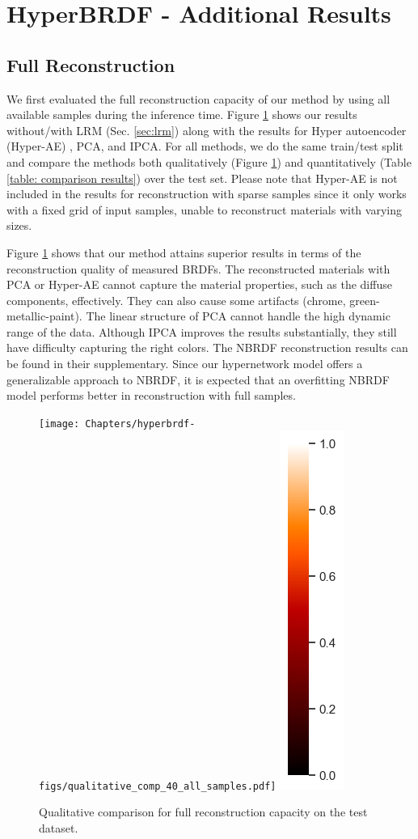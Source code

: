 \section{HyperBRDF - Additional Results}
\label{hyperbrdf:add_res}

\subsection{Full Reconstruction}\label{sec:full_rec}

We first evaluated the full reconstruction capacity of our method by using all available samples during the inference time. Figure \ref{fig:qual_comp} shows our results without/with LRM (Sec. \ref{sec:lrm}) along with the results for Hyper autoencoder (Hyper-AE) \cite{sztrajman2021neural}, PCA, and IPCA. For all methods, we do the same train/test split and compare the methods both qualitatively (Figure \ref{fig:qual_comp}) and quantitatively (Table \ref{table: comparison results}) over the test set. Please note that Hyper-AE is not included in the results for reconstruction with sparse samples since it only works with a fixed grid of input samples, unable to reconstruct materials with varying sizes. 


Figure \ref{fig:qual_comp} shows that our method attains superior results in terms of the reconstruction quality of measured BRDFs. The reconstructed materials with PCA or Hyper-AE cannot capture the material properties, such as the diffuse components, effectively. They can also cause some artifacts (chrome, green-metallic-paint). The linear structure of PCA cannot handle the high dynamic range of the data. Although IPCA \cite{nielsen2015optimal} improves the results substantially, they still have difficulty capturing the right colors. The NBRDF \cite{sztrajman2021neural} reconstruction results can be found in their supplementary. Since our hypernetwork model offers a generalizable approach to NBRDF, it is expected that an overfitting NBRDF model performs better in reconstruction with full samples. 

\begin{figure}
  \centering
{}%
  {\texttt{[image: Chapters/hyperbrdf-figs/qualitative\_comp\_40\_all\_samples.pdf]}}
    \includegraphics[width=0.02\linewidth]{Chapters/hyperbrdf-figs/vbar.png}

   \caption{Qualitative comparison for full reconstruction capacity on the test dataset.}

   \label{fig:qual_comp}
\end{figure}

